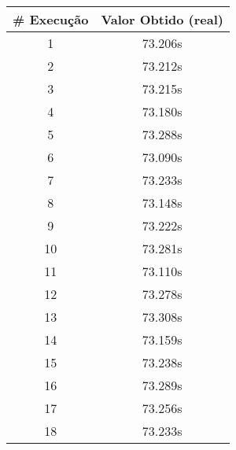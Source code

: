 \documentclass[11pt]{article}
\begin{document}
\begin{table}[!h]
\begin{center}
\begin{minipage}{0.48\textwidth}
\begin{tabular}{| c | c |}
				\textbf{\# Execução} &  \textbf{Valor Obtido (real)} \\ \hline
				1 & 73.206s \\ \hline
				2 & 73.212s \\ \hline
				3 & 73.215s \\ \hline
				4 & 73.180s \\ \hline
				5 & 73.288s \\ \hline
				6 & 73.090s \\ \hline
				7 & 73.233s \\ \hline
				8 & 73.148s \\ \hline
				9 & 73.222s \\ \hline
				10 & 73.281s \\ \hline
				11 & 73.110s \\ \hline
				12 & 73.278s \\ \hline
				13 & 73.308s \\ \hline
				14 & 73.159s \\ \hline
				15 & 73.238s \\ \hline
				16 & 73.289s \\ \hline
				17 & 73.256s \\ \hline
				18 & 73.233s \\ \hline
			\end{tabular}
		\end{minipage}
	\end{center}
\end{table}

\pagebreak
\end{document}
